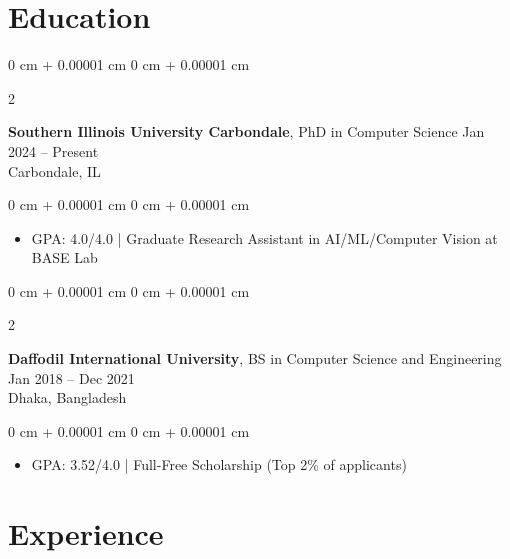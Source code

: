\documentclass[9pt, letterpaper]{article}
\newenvironment{highlights}{
    \begin{itemize}[
        topsep=0.05 cm,
        parsep=0.05 cm,
        partopsep=0pt,
        itemsep=0pt,
        leftmargin=0 cm + 10pt
    ]
}{
    \end{itemize}
} %
\newenvironment{onecolentry}{
    \begin{adjustwidth}{
        0 cm + 0.00001 cm
    }{
        0 cm + 0.00001 cm
    }
}{
    \end{adjustwidth}
} %
\newenvironment{twocolentry}[2][]{
    \onecolentry
    \def\secondColumn{#2}
    \setcolumnwidth{\fill, 4.5 cm}
    \begin{paracol}{2}
}{
    \switchcolumn \raggedleft \secondColumn
    \end{paracol}
    \endonecolentry
} %
\begin{document}
   \section{Education}
        \begin{twocolentry}{
            Jan 2024 – Present
            \\Carbondale, IL
        }
            \textbf{Southern Illinois University Carbondale}, PhD in Computer Science\end{twocolentry}
        \vspace{-0.40 cm}
        \begin{onecolentry}
            \begin{highlights}
                \item GPA: 4.0/4.0 | Graduate Research Assistant in AI/ML/Computer Vision at BASE Lab
            \end{highlights}
        \end{onecolentry}
        \vspace{0.15 cm}
        \begin{twocolentry}{
            Jan 2018 – Dec 2021
            \\Dhaka, Bangladesh
        }
            \textbf{Daffodil International University}, BS in Computer Science and Engineering\end{twocolentry}
        \vspace{-0.40 cm}
        \begin{onecolentry}
            \begin{highlights}
                \item GPA: 3.52/4.0 | Full-Free Scholarship (Top 2\% of applicants)
            \end{highlights}
        \end{onecolentry}
    
   \section{Experience}
        
\end{document}
